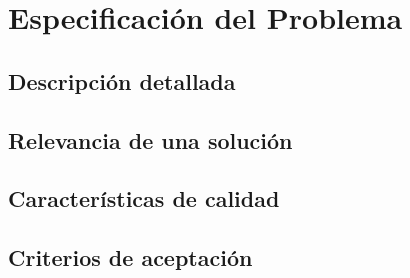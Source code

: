 \chapter{Especificaci\'on del Problema}
\label{sec-3}

\section{Descripci\'on detallada}
\label{sec-3.1}

\section{Relevancia de una soluci\'on}
\label{sec-3.2}

\section{Caracter\'isticas de calidad}
\label{sec-3.3}

\section{Criterios de aceptaci\'on}
\label{sec-3.4}